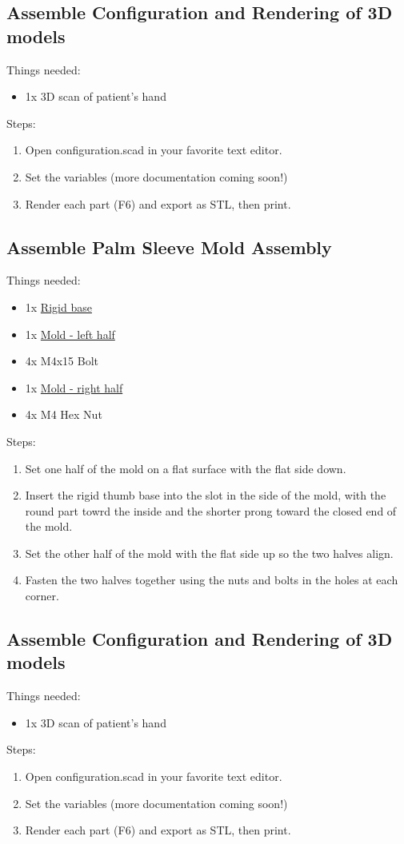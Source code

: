 \documentclass[11pt]{article}
\begin{document}
\subsection{Assemble Configuration and Rendering of 3D models}
Things needed:
\begin{itemize}
\item 1x 3D scan of patient's hand
\end{itemize}
Steps:
\begin{enumerate}
\item Open configuration.scad in your favorite text editor.
\item Set the variables (more documentation coming soon!)
\item Render each part (F6) and export as STL, then print.
\end{enumerate}

\subsection{Assemble Palm Sleeve Mold Assembly}
Things needed:
\begin{itemize}
\item 1x \hyperlink{thing_rigid\_base}{Rigid base}
\item 1x \hyperlink{thing_mold\_left\_half}{Mold - left half}
\item 4x M4x15 Bolt
\item 1x \hyperlink{thing_mold\_right\_half}{Mold - right half}
\item 4x M4 Hex Nut
\end{itemize}
Steps:
\begin{enumerate}
\item Set one half of the mold on a flat surface with the flat side down.
\item Insert the rigid thumb base into the slot in the side of the mold, with the round part towrd the inside and the shorter prong toward the closed end of the mold.
\item Set the other half of the mold with the flat side up so the two halves align.
\item Fasten the two halves together using the nuts and bolts in the holes at each corner.
\end{enumerate}

\subsection{Assemble Configuration and Rendering of 3D models}
Things needed:
\begin{itemize}
\item 1x 3D scan of patient's hand
\end{itemize}
Steps:
\begin{enumerate}
\item Open configuration.scad in your favorite text editor.
\item Set the variables (more documentation coming soon!)
\item Render each part (F6) and export as STL, then print.
\end{enumerate}
\end{document}
